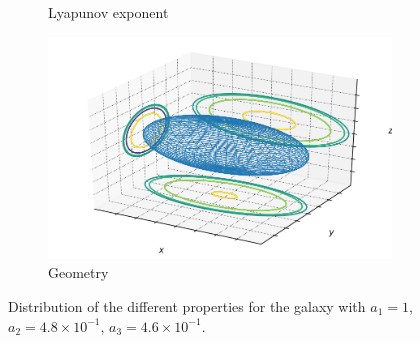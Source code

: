 \begin{figure}[h]
\begin{subfigure}[t]{0.4\textwidth}
        \caption{Lyapunov exponent}
    \end{subfigure}
    \begin{subfigure}[t]{0.4\textwidth}
        \includegraphics[width=\textwidth]{"../Files/Week 13/images/0_ellipsoid"}
        \caption{Geometry}
    \end{subfigure}
    \caption{Distribution of the different properties for the galaxy with $a_1 = 1$, $a_2 = 4.8\times10^{-1}$, $a_3 = 4.6\times10^{-1}$.}
\end{figure}


